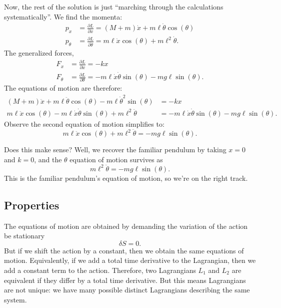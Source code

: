 Now, the rest of the solution is just ``marching through the
calculations systematically''. We find the momenta:
\begin{subequations}
\begin{align}
p_{x} &= \frac{\partial L}{\partial\dot{x}} = (M + m)\dot{x} + m\ell\dot{\theta}\cos(\theta)\\
p_{\theta} &= \frac{\partial L}{\partial\dot{\theta}}
= m\ell\dot{x}\cos(\theta) + m\ell^{2}\dot\theta.
\end{align}
\end{subequations}
The generalized forces,
\begin{subequations}
\begin{align}
F_{x} &= \frac{\partial L}{\partial x} = -kx\\
F_{\theta} &= \frac{\partial L}{\partial \theta} = -m\ell\dot{x}\dot{\theta}\sin(\theta)
  -mg\ell\sin(\theta).
\end{align}
\end{subequations}
The equations of motion are therefore:
\begin{subequations}
\begin{align}
  (M + m)\ddot{x} + m\ell\ddot{\theta}\cos(\theta)
  - m\ell\dot{\theta}^{2}\sin(\theta) &= -kx\\
  m\ell\ddot{x}\cos(\theta)
  - m\ell\dot{x}\dot{\theta}\sin(\theta)
  + m\ell^{2}\ddot\theta &= -m\ell\dot{x}\dot{\theta}\sin(\theta)
  -mg\ell\sin(\theta).
\end{align}
\end{subequations}
Observe the second equation of motion simplifies to:
\begin{equation}
  m\ell\ddot{x}\cos(\theta) + m\ell^{2}\ddot\theta =  -mg\ell\sin(\theta).
\end{equation}

Does this make sense? Well, we recover the familiar pendulum by taking
$x=0$ and $k=0$, and the $\theta$ equation of motion survives as
\begin{equation}
m\ell^{2}\ddot\theta =  -mg\ell\sin(\theta).
\end{equation}
This is the familiar pendulum's equation of motion, so we're on the
right track.

\subsection{Properties}

The equations of motion are obtained by demanding the variation of the
action be stationary
\begin{equation}
\delta S = 0.
\end{equation}
But if we shift the action by a constant, then we obtain the same
equations of motion. Equivalently, if we add a total time derivative to
the Lagrangian, then we add a constant term to the action. Therefore,
two Lagrangians $L_{1}$ and $L_{2}$ are equivalent if they differ by a
total time derivative. But this means Lagrangians are not unique: we
have many possible distinct Lagrangians describing the same system.

